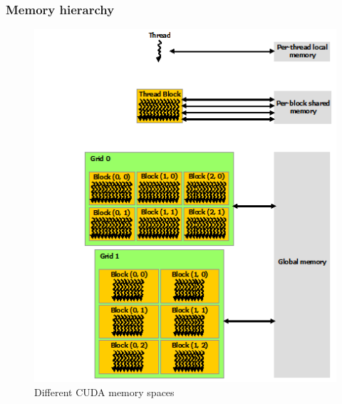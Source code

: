 \subsubsection{Memory hierarchy}
\begin{figure}[ht!]
\centering
\includegraphics[]{img/memory-hierarchy.png}
\caption{Different CUDA memory spaces}
\label{cudamemoryhierarchy}
\end{figure}

